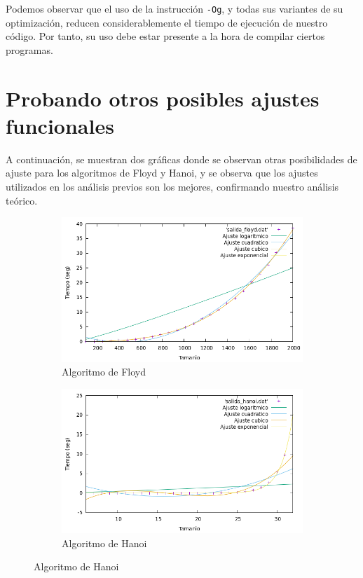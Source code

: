 \documentclass[10pt,a4paper]{article}
\begin{document}
\newpage

Podemos observar que el uso de la instrucción \texttt{-Og}, y todas sus variantes de su optimización, reducen considerablemente el tiempo de ejecución de nuestro código. Por tanto, su uso debe estar presente a la hora de compilar ciertos programas.

\section{Probando otros posibles ajustes funcionales}

A continuación, se muestran dos gráficas donde se observan otras posibilidades de ajuste para los algoritmos de Floyd y Hanoi, y se observa que los ajustes utilizados en los análisis previos son los mejores, confirmando nuestro análisis teórico.

\begin{figure}[h!]
\begin{subfigure}{.5\textwidth}
	\centering
	\includegraphics[scale=0.25]{../../Images/floy_comparacion.png}
	\caption{Algoritmo de Floyd}
\end{subfigure}
\begin{subfigure}{.5\textwidth}
	\centering
	\includegraphics[scale=0.25]{../../Images/hanoi_comparacion.png}
	\caption{Algoritmo de Hanoi}
\end{subfigure}
\end{figure}
\end{document}
